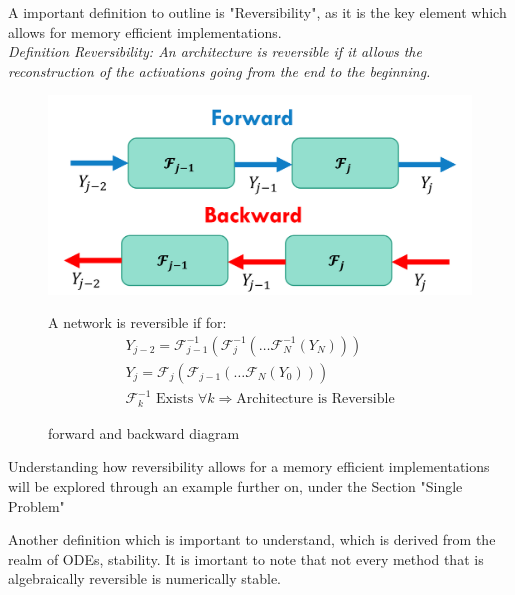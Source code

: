 \documentclass{article}
\theoremstyle{remark}
\begin{document}
\par 
    A important definition to outline is "Reversibility", as it is the key element which allows for memory efficient implementations.\\
\textit{Definition Reversibility: An architecture is reversible if it allows the reconstruction of the activations going from the end to the beginning.}

\begin{figure}[H]
    \centering
    \begin{minipage}{0.45\textwidth}
        \centering
        \includegraphics[scale=0.5]{imgs/revesibility_chart.png} %
        \caption{forward and backward diagram}
    \end{minipage}\hfill
    \begin{minipage}{0.45\textwidth}
        \centering
        A network is reversible if for:
        \begin{gather*}
            Y_{j-2} = \mathcal{F}^{-1}_{j-1}(\mathcal{F}^{-1}_{j}(\dots \mathcal{F}^{-1}_{N}(Y_N)))\\
            Y_j = \mathcal{F}_{j}(\mathcal{F}_{j-1}(\dots \mathcal{F}_{N}(Y_0))) \\
            \mathcal{F}^{-1}_{k} \text{ Exists } \forall k \Rightarrow \text{Architecture is Reversible}
        \end{gather*}
    \end{minipage}
\end{figure}

Understanding how reversibility allows for a memory efficient implementations will be explored through an example further on, under the Section "Single Problem" \par

Another definition which is important to understand, which is derived from the realm of ODEs, stability. It is imortant to note that not every method that is algebraically reversible 
is numerically stable.\\
\end{document}
